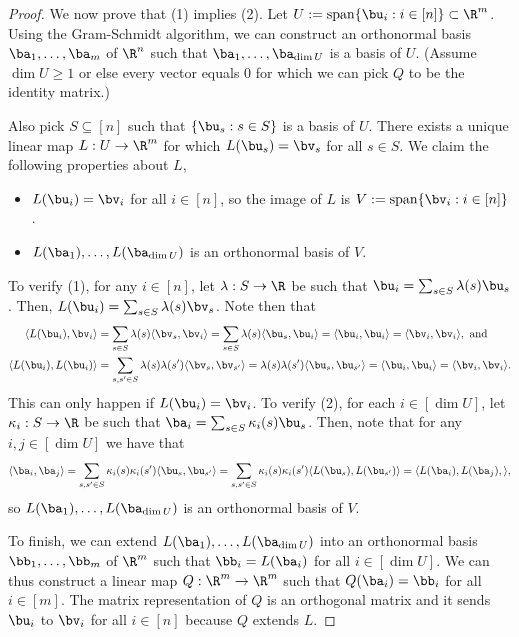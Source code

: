 {\begin{proof}
We now prove that (1) implies (2). Let $U := \operatorname{span}\{\bu_i : i \in [n]\} \subset \R^{m}$. Using the Gram-Schmidt algorithm, we can construct an orthonormal basis $\ba_1, \hdots, \ba_m$ of $\R^n$ such that $\ba_1, \hdots, \ba_{\dim U}$ is a basis of $U$. (Assume $\dim U \ge 1$ or else every vector equals $0$ for which we can pick $Q$ to be the identity matrix.)

Also pick $S \subseteq [n]$ such that $\{\bu_{s} : s \in S\}$ is a basis of $U$. There exists a unique linear map $L : U \to \R^m$ for which $L(\bu_{s}) = \bv_s$ for all $s \in S$. We claim the following properties about $L$,
\begin{itemize}
\item[(1)] $L(\bu_i) = \bv_i$ for all $i \in [n]$, so the image of $L$ is $V:= \operatorname{span}\{\bv_i : i \in [n]\}$.
\item[(2)] $L(\ba_1), \hdots, L(\ba_{\dim U})$ is an orthonormal basis of $V$.
\end{itemize}
To verify (1), for any $i \in [n]$, let $\lambda : S \to \R$ be such that $\bu_i = \sum_{s \in S} \lambda(s)\bu_s$. Then, $L(\bu_i) = \sum_{s \in S} \lambda(s)\bv_s$. Note then that
\begin{align*}
\langle L(\bu_i), \bv_i\rangle &= \sum_{s \in S} \lambda(s) \langle \bv_s, \bv_i\rangle = \sum_{s\in S} \lambda(s) \langle \bu_s, \bu_i\rangle = \langle \bu_i, \bu_i\rangle = \langle \bv_i, \bv_i\rangle, \text{ and}\\
\langle L(\bu_i), L(\bu_i)\rangle &= \sum_{s,s' \in S} \lambda(s)\lambda(s') \langle \bv_s, \bv_{s'}\rangle = \lambda(s)\lambda(s') \langle \bu_s, \bu_{s'}\rangle = \langle \bu_i, \bu_i\rangle = \langle \bv_i, \bv_i\rangle.
\end{align*}
This can only happen if $L(\bu_i) = \bv_i$. To verify (2), for each $i \in [\dim U]$, let $\kappa_i : S \to \R$ be such that $\ba_i = \sum_{s\in S} \kappa_i(s) \bu_s$. Then, note that for any $i,j \in [\dim U]$ we have that
\[
\langle \ba_i, \ba_j \rangle = \sum_{s,s'\in S}\kappa_i(s)\kappa_i(s') \langle \bu_s, \bu_{s'}\rangle = \sum_{s,s'\in S}\kappa_i(s)\kappa_i(s') \langle L(\bu_s), L(\bu_{s'})\rangle = \langle L(\ba_i), L(\ba_j), \rangle,
\]
so $L(\ba_1), \hdots, L(\ba_{\dim U})$ is an orthonormal basis of $V$.

To finish, we can extend $L(\ba_1), \hdots, L(\ba_{\dim U})$ into an orthonormal basis $\bb_1, \hdots, \bb_m$ of $\R^m$ such that $\bb_i = L(\ba_i)$ for all $i \in [\dim U]$. We can thus construct a linear map $Q : \R^m \to \R^m$ such that $Q(\ba_i) = \bb_i$ for all $i \in [m]$. The matrix representation of $Q$ is an orthogonal matrix and it sends $\bu_i$ to $\bv_i$ for all $i \in [n]$ because $Q$ extends $L$.
\end{proof}

}

